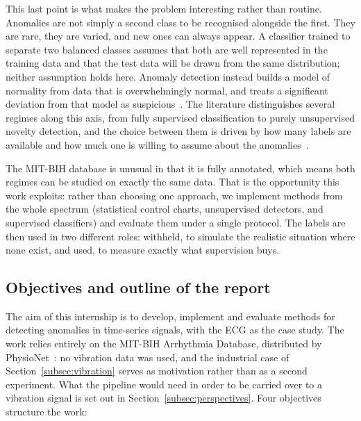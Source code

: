 \documentclass[a4paper, 12pt]{article}
\begin{document}
This last point is what makes the problem interesting rather than routine. Anomalies are not
simply a second class to be recognised alongside the first. They are rare, they are varied,
and new ones can always appear. A classifier trained to separate two balanced classes assumes
that both are well represented in the training data and that the test data will be drawn from
the same distribution; neither assumption holds here. Anomaly detection instead builds a model
of normality from data that is overwhelmingly normal, and treats a significant deviation from
that model as suspicious~\cite{chandola2009survey}. The literature distinguishes several
regimes along this axis, from fully supervised classification to purely unsupervised novelty
detection, and the choice between them is driven by how many labels are available and how much
one is willing to assume about the anomalies~\cite{ruff2021unifying}.

The MIT-BIH database is unusual in that it is fully annotated, which means both regimes can be
studied on exactly the same data. That is the opportunity this work exploits: rather than
choosing one approach, we implement methods from the whole spectrum (statistical control
charts, unsupervised detectors, and supervised classifiers) and evaluate them under a single
protocol. The labels are then used in two different roles: withheld, to simulate the realistic
situation where none exist, and used, to measure exactly what supervision buys.


\subsection{Objectives and outline of the report} \label{subsec:objectives}

The aim of this internship is to develop, implement and evaluate methods for detecting
anomalies in time-series signals, with the ECG as the case study. The work relies entirely on
the MIT-BIH Arrhythmia Database, distributed by PhysioNet~\cite{goldberger2000physionet}: no
vibration data was used, and the industrial case of Section~\ref{subsec:vibration} serves as
motivation rather than as a second experiment. What the pipeline would need in order to be
carried over to a vibration signal is set out in Section~\ref{subsec:perspectives}. Four
objectives structure the work:
\end{document}
